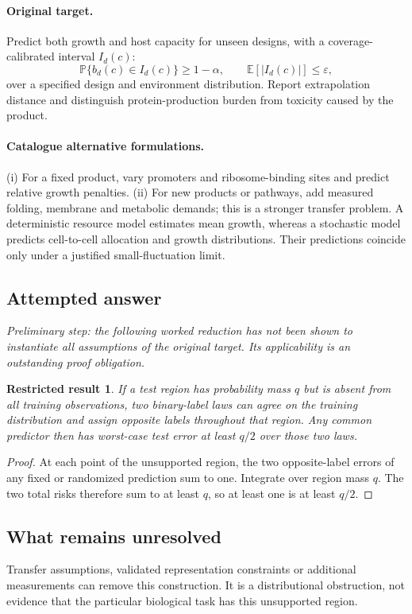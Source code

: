 \documentclass[11pt]{article}
\newcommand{\E}{\mathbb E}
\newcommand{\Prob}{\mathbb P}
\providecommand{\E}{\mathbb E}
\providecommand{\Prob}{\mathbb P}
\newtheorem{attemptresult}{Restricted result}[section]
\begin{document}
\paragraph{Original target.}
Predict both growth and host capacity for unseen designs, with a coverage-calibrated interval $I_d(c)$:
\[
\Prob\{b_d(c)\in I_d(c)\}\geq1-\alpha,
\qquad\E[|I_d(c)|]\leq\varepsilon,
\]
over a specified design and environment distribution. Report extrapolation distance and distinguish protein-production burden from toxicity caused by the product.
\paragraph{Catalogue alternative formulations.}
(i) For a fixed product, vary promoters and ribosome-binding sites and predict relative growth penalties. (ii) For new products or pathways, add measured folding, membrane and metabolic demands; this is a stronger transfer problem. A deterministic resource model estimates mean growth, whereas a stochastic model predicts cell-to-cell allocation and growth distributions. Their predictions coincide only under a justified small-fluctuation limit.
\subsection{Attempted answer}
\noindent\emph{Preliminary step: the following worked reduction has not been shown to instantiate all assumptions of the original target. Its applicability is an outstanding proof obligation.}

\begin{attemptresult}
If a test region has probability mass $q$ but is absent from all training observations, two binary-label laws can agree on the training distribution and assign opposite labels throughout that region. Any common predictor then has worst-case test error at least $q/2$ over those two laws.
\end{attemptresult}
\begin{proof}
At each point of the unsupported region, the two opposite-label errors of any fixed or randomized prediction sum to one. Integrate over region mass $q$. The two total risks therefore sum to at least $q$, so at least one is at least $q/2$.
\end{proof}
\subsection{What remains unresolved}
Transfer assumptions, validated representation constraints or additional measurements can remove this construction. It is a distributional obstruction, not evidence that the particular biological task has this unsupported region.
\end{document}
